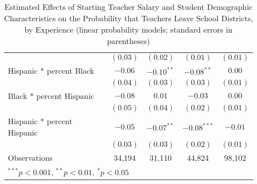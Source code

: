 \documentclass[]{article}
\begin{document}
\begin{table}
\begin{center}
\begin{tabular}{l c c c c }
                                            & $(0.03)$    & $(0.02)$     & $(0.01)$      & $(0.01)$      \\
\quad Hispanic * percent Black              & $-0.06$     & $-0.10^{**}$ & $-0.08^{**}$  & $0.00$        \\
                                            & $(0.04)$    & $(0.03)$     & $(0.03)$      & $(0.01)$      \\
\quad Black * percent Hispanic              & $-0.08$     & $0.01$       & $-0.03$       & $0.00$        \\
                                            & $(0.05)$    & $(0.04)$     & $(0.02)$      & $(0.01)$      \\
\quad Hispanic * percent Hispanic           & $-0.05$     & $-0.07^{**}$ & $-0.08^{***}$ & $-0.01$       \\
                                            & $(0.03)$    & $(0.03)$     & $(0.02)$      & $(0.01)$      \\
\hline
Observations                                & 34,194       & 31,110        & 44,824         & 98,102         \\
\hline
\multicolumn{5}{l}{\scriptsize{$^{***}p<0.001$, $^{**}p<0.01$, $^*p<0.05$}}
\end{tabular}
\caption{Estimated Effects of Starting Teacher Salary and Student Demographic Characteristics on the Probability that Teachers Leave School Districts, by Experience (linear probability models; standard errors in parentheses)}
\label{tbl:reg_lpm}
\end{center}
\end{table}
\end{document}
